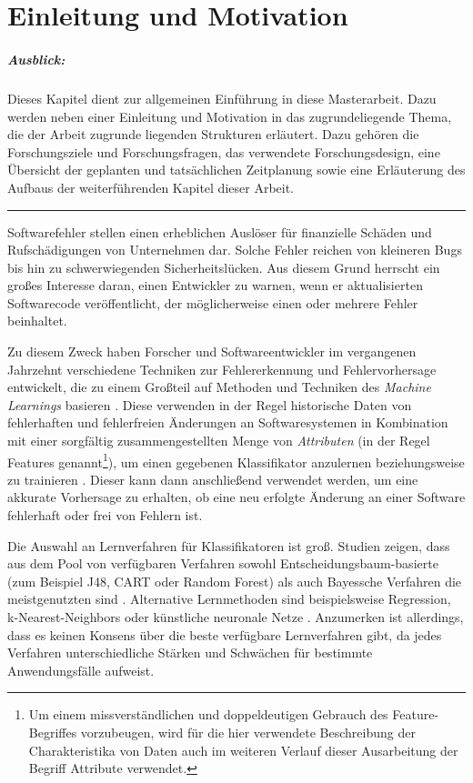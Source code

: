 
\chapter{Einleitung und Motivation}
\label{introduction}

\paragraph{Ausblick:}
Dieses Kapitel dient zur allgemeinen Einführung in diese Masterarbeit. Dazu werden neben einer Einleitung und Motivation in das zugrundeliegende Thema, die der Arbeit zugrunde liegenden Strukturen erläutert. Dazu gehören die Forschungsziele und Forschungsfragen, das verwendete Forschungsdesign, eine Übersicht der geplanten und tatsächlichen Zeitplanung sowie eine Erläuterung des Aufbaus der weiterführenden Kapitel dieser Arbeit.
\\
\hrule

Softwarefehler stellen einen erheblichen Auslöser für finanzielle Schäden und Rufschädigungen von Unternehmen dar. Solche Fehler reichen von kleineren \glqq Bugs\grqq{} bis hin zu schwerwiegenden Sicherheitslücken. Aus diesem Grund herrscht ein großes Interesse daran, einen Entwickler zu warnen, wenn er aktualisierten Softwarecode veröffentlicht, der möglicherweise einen oder mehrere Fehler beinhaltet. 

Zu diesem Zweck haben Forscher und Softwareentwickler im vergangenen Jahrzehnt verschiedene Techniken zur Fehlererkennung und Fehlervorhersage entwickelt, die zu einem Großteil auf Methoden und Techniken des \emph{Machine Learnings} basieren \cite{Challagulla2008}. Diese verwenden in der Regel historische Daten von fehlerhaften und fehlerfreien Änderungen an Softwaresystemen in Kombination mit einer sorgfältig zusammengestellten Menge von \emph{Attributen} (in der Regel Features genannt\footnote{Um einem missverständlichen und doppeldeutigen Gebrauch des Feature-Begriffes vorzubeugen, wird für die hier verwendete Beschreibung der Charakteristika von Daten auch im weiteren Verlauf dieser Ausarbeitung der Begriff \glqq Attribute\grqq{} verwendet.}), um einen gegebenen Klassifikator anzulernen beziehungsweise zu trainieren \cite{Alsaeedi2019,Hammouri2018}. Dieser kann dann anschließend verwendet werden, um eine akkurate Vorhersage zu erhalten, ob eine neu erfolgte Änderung an einer Software fehlerhaft oder frei von Fehlern ist.

Die Auswahl an Lernverfahren für Klassifikatoren ist groß. Studien zeigen, dass aus dem Pool von verfügbaren Verfahren sowohl Entscheidungsbaum-basierte (zum Beispiel J48, CART oder Random Forest) als auch Bayessche Verfahren die meistgenutzten sind \cite{Son2019}. Alternative Lernmethoden sind beispielsweise Regression, k-Nearest-Neighbors oder künstliche neuronale Netze \cite{Challagulla2008}. Anzumerken ist allerdings, dass es keinen Konsens über die beste verfügbare Lernverfahren gibt, da jedes Verfahren unterschiedliche Stärken und Schwächen für bestimmte Anwendungsfälle aufweist.

